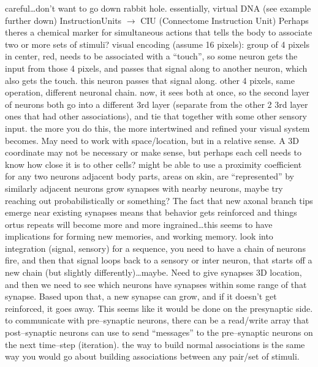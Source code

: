 \documentclass[11pt, a4paper, oneside]{article}   	%
\begin{document}
\begin{outline}
    \subpoint careful\ldots don't want to go down rabbit hole.
    \subpoint essentially, virtual DNA (see example further down)
        \subsubpoint InstructionUnits $\rightarrow$ CIU (Connectome Instruction Unit)
  \point Perhaps theres a chemical marker for simultaneous actions that tells the body to associate two or more sets of stimuli?
  \point visual encoding (assume 16 pixels):
    \subpoint group of 4 pixels in center, red, needs to be associated with a ``touch'', so some neuron gets the input from those 4 pixels, and passes that signal along to another neuron, which also gets the touch. this neuron passes that signal along.
    \subpoint other 4 pixels, same operation, different neuronal chain.
    \subpoint now, it sees both at once, so the second layer of neurons both go into a different 3rd layer (separate from the other 2 3rd layer ones that had other associations), and tie that together with some other sensory input.
    \subpoint the more you do this, the more intertwined and refined your visual system becomes.
\point May need to work with space/location, but in a relative sense. A 3D coordinate may not be necessary or make sense, but perhaps each cell needs to know how close it is to other cells?
    \subpoint might be able to use a proximity coefficient for any two neurons
    \subpoint adjacent body parts, areas on skin, are ``represented'' by similarly adjacent neurons
\point grow synapses with nearby neurons, maybe try reaching out probabilistically or something?
\point The fact that new axonal branch tips emerge near existing synapses means that behavior gets reinforced and things ortus repeats will become more and more ingrained\ldots this seems to have implications for forming new memories, and working memory.
\point look into integration (signal, sensory)
\point for a sequence, you need to have a chain of neurons fire, and then that signal loops back to a sensory or inter neuron, that starts off a new chain (but slightly differently)\ldots maybe.
\point Need to give synapses 3D location, and then we need to see which neurons have synapses within some range of that synapse. 
    \subpoint Based upon that, a new synapse can grow, and if it doesn't get reinforced, it goes away. This seems like it would be done on the presynaptic side.
\point to communicate with pre--synaptic neurons, there can be a read/write array that post--synaptic neurons can use to send ``messages'' to the pre--synaptic neurons on the next time--step (iteration). 
\point the way to build normal associations is the same way you would go about building associations between any pair/set of stimuli.

\end{outline}
\end{document}
